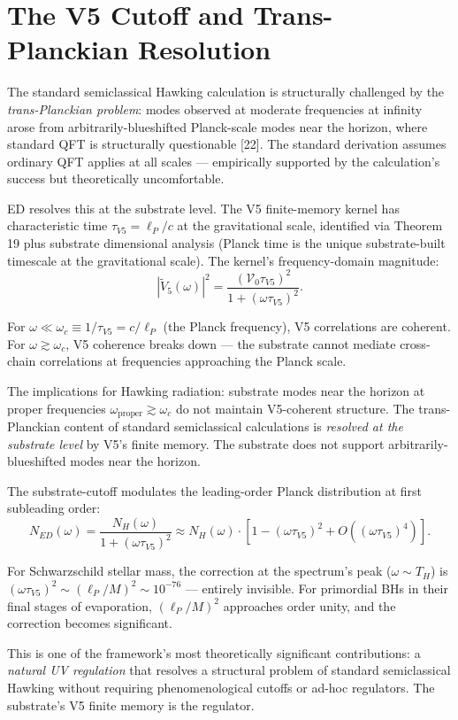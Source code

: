 \documentclass[11pt,a4paper]{article}
\begin{document}
\section{The V5 Cutoff and Trans-Planckian Resolution}

The standard semiclassical Hawking calculation is structurally challenged by the \emph{trans-Planckian problem}: modes observed at moderate frequencies at infinity arose from arbitrarily-blueshifted Planck-scale modes near the horizon, where standard QFT is structurally questionable [22]. The standard derivation assumes ordinary QFT applies at all scales --- empirically supported by the calculation's success but theoretically uncomfortable.

ED resolves this at the substrate level. The V5 finite-memory kernel has characteristic time $\tau_{V5} = \ell_P/c$ at the gravitational scale, identified via Theorem 19 plus substrate dimensional analysis (Planck time is the unique substrate-built timescale at the gravitational scale). The kernel's frequency-domain magnitude:
\[
|\tilde V_5(\omega)|^2 = \frac{(\mathcal{V}_0 \tau_{V5})^2}{1 + (\omega\tau_{V5})^2}.
\]

For $\omega \ll \omega_c \equiv 1/\tau_{V5} = c/\ell_P$ (the Planck frequency), V5 correlations are coherent. For $\omega \gtrsim \omega_c$, V5 coherence breaks down --- the substrate cannot mediate cross-chain correlations at frequencies approaching the Planck scale.

The implications for Hawking radiation: substrate modes near the horizon at proper frequencies $\omega_{\mathrm{proper}} \gtrsim \omega_c$ do not maintain V5-coherent structure. The trans-Planckian content of standard semiclassical calculations is \emph{resolved at the substrate level} by V5's finite memory. The substrate does not support arbitrarily-blueshifted modes near the horizon.

The substrate-cutoff modulates the leading-order Planck distribution at first subleading order:
\[
N_{ED}(\omega) = \frac{N_H(\omega)}{1 + (\omega\tau_{V5})^2} \approx N_H(\omega) \cdot \left[1 - (\omega\tau_{V5})^2 + O((\omega\tau_{V5})^4)\right].
\]

For Schwarzschild stellar mass, the correction at the spectrum's peak ($\omega \sim T_H$) is $(\omega\tau_{V5})^2 \sim (\ell_P/M)^2 \sim 10^{-76}$ --- entirely invisible. For primordial BHs in their final stages of evaporation, $(\ell_P/M)^2$ approaches order unity, and the correction becomes significant.

This is one of the framework's most theoretically significant contributions: a \emph{natural UV regulation} that resolves a structural problem of standard semiclassical Hawking without requiring phenomenological cutoffs or ad-hoc regulators. The substrate's V5 finite memory is the regulator.
\end{document}
